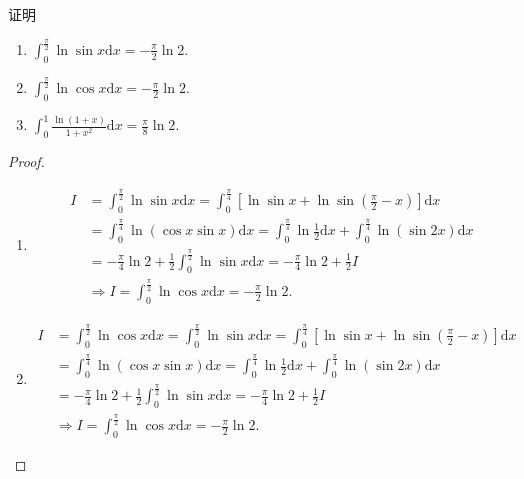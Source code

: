 \documentclass[../../main.tex]{subfiles}
\begin{document}
\begin{proposition}\label{example:常见积分1}
证明
\begin{enumerate}
\item \(\int_{0}^{\frac{\pi}{2}} \ln\sin x\mathrm{d}x=-\frac{\pi}{2}\ln 2.\)

\item \(\int_{0}^{\frac{\pi}{2}} \ln\cos x\mathrm{d}x=-\frac{\pi}{2}\ln 2.\)

\item \(\int_{0}^{1} \frac{\ln(1 + x)}{1 + x^2}\mathrm{d}x=\frac{\pi}{8}\ln 2.\)
\end{enumerate}
\end{proposition}
\begin{proof}
\begin{enumerate}
\item \begin{align*}
I&=\int_0^{\frac{\pi}{2}}{\ln\sin x\mathrm{d}x}=\int_0^{\frac{\pi}{4}}{\left[ \ln\sin x+\ln \sin \left( \frac{\pi}{2}-x \right) \right] \mathrm{d}x}
\\
&=\int_0^{\frac{\pi}{4}}{\ln \left( \cos x\sin x \right) \mathrm{d}x}=\int_0^{\frac{\pi}{4}}{\ln \frac{1}{2}\mathrm{d}x}+\int_0^{\frac{\pi}{4}}{\ln \left( \sin 2x \right) \mathrm{d}x}
\\
&=-\frac{\pi}{4}\ln 2+\frac{1}{2}\int_0^{\frac{\pi}{2}}{\ln\sin x\mathrm{d}x}=-\frac{\pi}{4}\ln 2+\frac{1}{2}I
\\
&\Longrightarrow I=\int_0^{\frac{\pi}{2}}{\ln\cos x\mathrm{d}x}=-\frac{\pi}{2}\ln 2.
\end{align*}

\item \begin{align*}
I&=\int_0^{\frac{\pi}{2}}{\ln\cos x\mathrm{d}x}=\int_0^{\frac{\pi}{2}}{\ln\sin x\mathrm{d}x}=\int_0^{\frac{\pi}{4}}{\left[ \ln\sin x+\ln \sin \left( \frac{\pi}{2}-x \right) \right] \mathrm{d}x}
\\
&=\int_0^{\frac{\pi}{4}}{\ln \left( \cos x\sin x \right) \mathrm{d}x}=\int_0^{\frac{\pi}{4}}{\ln \frac{1}{2}\mathrm{d}x}+\int_0^{\frac{\pi}{4}}{\ln \left( \sin 2x \right) \mathrm{d}x}
\\
&=-\frac{\pi}{4}\ln 2+\frac{1}{2}\int_0^{\frac{\pi}{2}}{\ln\sin x\mathrm{d}x}=-\frac{\pi}{4}\ln 2+\frac{1}{2}I
\\
&\Longrightarrow I=\int_0^{\frac{\pi}{2}}{\ln\cos x\mathrm{d}x}=-\frac{\pi}{2}\ln 2.
\end{align*}


\end{enumerate}
\end{proof}
\end{document}
